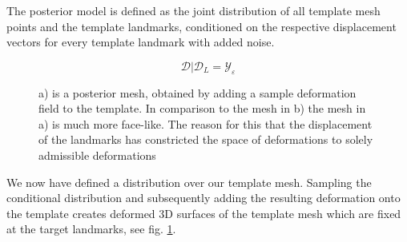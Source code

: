 The posterior model is defined as the joint distribution of all template mesh points and the
template landmarks, conditioned on the respective displacement vectors for every template landmark with added noise. 
\begin{center}
\begin{equation}
    \mathcal{D}\vert \mathcal{D}_{L} = \mathcal{Y}_{\varepsilon} 
\end{equation}
\end{center}
\begin{figure}[h!]
    \centering
    \quad\quad
    \caption{a) is a posterior mesh, obtained by adding a sample deformation field to the template. In comparison to the mesh in b) the mesh in a) is much more face-like. The reason for this that the displacement of the landmarks has constricted the space of deformations to solely admissible deformations}
\label{fig:meshposterior}
\end{figure}
We now have defined a distribution over our template mesh. Sampling the conditional distribution and subsequently adding the resulting deformation onto the template creates deformed 3D surfaces of the template mesh which are fixed at the target landmarks, see fig. \ref{fig:meshposterior}.

